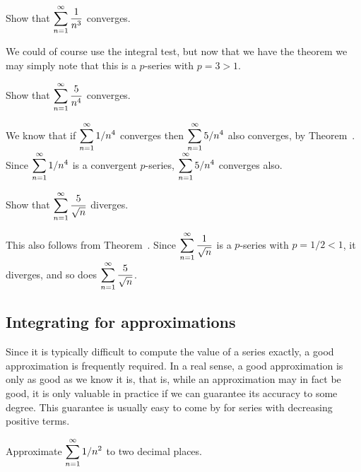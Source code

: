 \begin{example} Show that $\displaystyle\sum_{n=1}^\infty {1\over {n^3}}$ converges. 
\end{example}

\begin{solution}
We could of course use
the integral test, but now that we have the theorem we may simply note
that this is a $p$-series with $p = 3>1$.
\end{solution}

\begin{example} Show that $\displaystyle\sum_{n=1}^\infty {5\over n^4}$ converges. 
\end{example}
\begin{solution}
We know that if
$\displaystyle \sum_{n=1}^\infty 1/n^4$ converges then $\displaystyle \sum_{n=1}^\infty 5/n^4$
also converges, by Theorem~. Since 
$\displaystyle \sum_{n=1}^\infty 1/n^4$ is a convergent $p$-series, 
 $\displaystyle \sum_{n=1}^\infty 5/n^4$ converges also.
\end{solution}

\begin{example} Show that $\displaystyle\sum_{n=1}^\infty {5\over \sqrt{n}}$ diverges.
\end{example}
\begin{solution}
This also follows from
Theorem~.  Since $\displaystyle\sum_{n=1}^\infty
{1\over \sqrt{n}}$ is a $p$-series with $p=1/2<1$, it diverges, and so
does $\displaystyle\sum_{n=1}^\infty {5\over \sqrt{n}}$.  
\end{solution}

\subsection{Integrating for approximations}

Since it is typically difficult to compute the value of a series
exactly, a good approximation is frequently required. In a real sense,
a good approximation is only as good as we know it is, that is, while
an approximation may in fact be good, it is only valuable in practice
if we can guarantee its accuracy to some degree. This guarantee is
usually easy to come by for series with decreasing positive terms.

\begin{example} Approximate $\displaystyle \sum_{n=1}^\infty 1/n^2$ to two decimal places.
\end{example}

